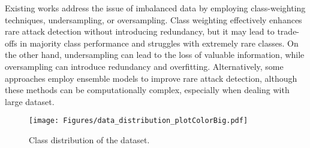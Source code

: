 Existing works address the issue of imbalanced data by employing class-weighting techniques, undersampling, or oversampling. Class weighting effectively enhances rare attack detection without introducing redundancy, but it may lead to trade-offs in majority class performance and struggles with extremely rare classes. On the other hand, undersampling can lead to the loss of valuable information, while oversampling can introduce redundancy and overfitting. Alternatively, some approaches employ ensemble models to improve rare attack detection, although these methods can be computationally complex, especially when dealing with large dataset.

 \begin{figure}[t]
\centering
\texttt{[image: Figures/data\_distribution\_plotColorBig.pdf]}
    \caption{Class distribution of the dataset.}
    \label{fig: DataDistribution}
\end{figure}

\begin{table}[t]
  \caption{Selected files from the CSE-CIC-IDS2018 dataset}
    \label{tab: Selected datasets}
\end{table}